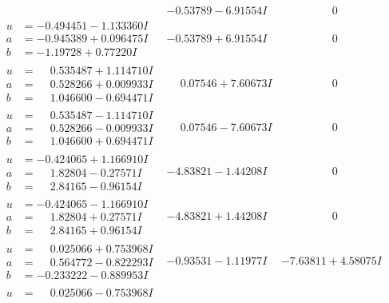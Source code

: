 \documentclass[1p]{elsarticle_modified}
\theoremstyle{definition}
\begin{document}
$$\begin{array}{c|c|c}
 & -0.53789 - 6.91554 I & \phantom{-0.000000 } 0 \\ \hline\begin{aligned}
u &= -0.494451 - 1.133360 I \\
a &= -0.945389 + 0.096475 I \\
b &= -1.19728 + 0.77220 I\end{aligned}
 & -0.53789 + 6.91554 I & \phantom{-0.000000 } 0 \\ \hline\begin{aligned}
u &= \phantom{-}0.535487 + 1.114710 I \\
a &= \phantom{-}0.528266 + 0.009933 I \\
b &= \phantom{-}1.046600 - 0.694471 I\end{aligned}
 & \phantom{-}0.07546 + 7.60673 I & \phantom{-0.000000 } 0 \\ \hline\begin{aligned}
u &= \phantom{-}0.535487 - 1.114710 I \\
a &= \phantom{-}0.528266 - 0.009933 I \\
b &= \phantom{-}1.046600 + 0.694471 I\end{aligned}
 & \phantom{-}0.07546 - 7.60673 I & \phantom{-0.000000 } 0 \\ \hline\begin{aligned}
u &= -0.424065 + 1.166910 I \\
a &= \phantom{-}1.82804 - 0.27571 I \\
b &= \phantom{-}2.84165 - 0.96154 I\end{aligned}
 & -4.83821 - 1.44208 I & \phantom{-0.000000 } 0 \\ \hline\begin{aligned}
u &= -0.424065 - 1.166910 I \\
a &= \phantom{-}1.82804 + 0.27571 I \\
b &= \phantom{-}2.84165 + 0.96154 I\end{aligned}
 & -4.83821 + 1.44208 I & \phantom{-0.000000 } 0 \\ \hline\begin{aligned}
u &= \phantom{-}0.025066 + 0.753968 I \\
a &= \phantom{-}0.564772 - 0.822293 I \\
b &= -0.233222 - 0.889953 I\end{aligned}
 & -0.93531 - 1.11977 I & -7.63811 + 4.58075 I \\ \hline\begin{aligned}
u &= \phantom{-}0.025066 - 0.753968 I \\

\end{aligned}
\end{array}$$
\end{document}
